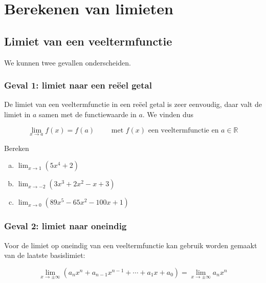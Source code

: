 \documentclass[12pt]{article}
\newenvironment{eigenschap}
{
  \vspace{0.4cm}
  \begin{mdframed}[nobreak=true,frametitle={Eigenschap}]
  }{%
  \end{mdframed}
}
\begin{document}
\pagebreak
\section{Berekenen van limieten}

\begin{theorie}

\subsection{Limiet van een veeltermfunctie}

We kunnen twee gevallen onderscheiden.

\subsubsection*{Geval 1: limiet naar een reëel getal}

De limiet van een veeltermfunctie in een reëel getal is zeer eenvoudig, daar valt de limiet in $a$ samen met de functiewaarde in $a$. We vinden dus

\begin{eigenschap}
  $$\lim_{x\to a}f(x)=f(a) \qquad \mbox{ met $f(x)$ een veeltermfunctie en $a\in\mathbb{R}$}$$
\end{eigenschap}

\end{theorie}

\begin{oefening}
  Bereken
  \begin{enumerate}[(a)]
  \itemsep.5em
  \item $\displaystyle\lim_{x\to1}\left(5x^4+2\right)$
  \item $\displaystyle\lim_{x\to-2}\left(3x^3+2x^2-x+3\right)$
  \item $\displaystyle\lim_{x\to0}\left(89x^5-65x^2-100x+1\right)$
  \end{enumerate}
\end{oefening}

\begin{theorie}

\subsubsection*{Geval 2: limiet naar oneindig}

Voor de limiet op oneindig van een veeltermfunctie kan gebruik worden gemaakt van de laatste basislimiet:

\begin{eigenschap}
  $$\lim_{x\to\pm\infty}\left(a_nx^n+a_{n-1}x^{n-1}+\cdots+a_1x+a_0\right) = \lim_{x\to\pm\infty}a_nx^n$$
\end{eigenschap}

\end{theorie}
\end{document}

